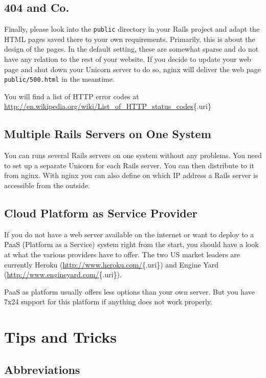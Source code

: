 \documentclass[a4paper]{book}
\newcommand{\chap}[1]{\newpage\thispagestyle{empty}\chapter{#1}\label{chap:\thechapter}}
\begin{document}
\section{404 and Co.}\label{and-co.}

Finally, please look into the \texttt{public} directory in your Rails project and adapt the HTML pages saved there to your own requirements. Primarily, this is about the design of the pages. In the default setting, these are somewhat sparse and do not have any relation to the rest of your website. If you decide to update your web page and shut down your Unicorn server to do so, nginx will deliver the web page \texttt{public/500.html} in the meantime.

You will find a list of HTTP error codes at \url{http://en.wikipedia.org/wiki/List_of_HTTP_status_codes}\{.uri\}

\section{Multiple Rails Servers on One System}\label{multiple-rails-servers-on-one-system}

You can runs several Rails servers on one system without any problems. You need to set up a separate Unicorn for each Rails server. You can then distribute to it from nginx. With nginx you can also define on which IP address a Rails server is accessible from the outside.

\section{Cloud Platform as Service Provider}\label{cloud-platform-as-service-provider}

If you do not have a web server available on the internet or want to deploy to a PaaS (Platform as a Service) system right from the start, you should have a look at what the various providers have to offer. The two US market leaders are currently Heroku (\url{http://www.heroku.com/}\{.uri\}) and Engine Yard (\url{http://www.engineyard.com/}\{.uri\}).

PaaS as platform usually offers less options than your own server. But you have 7x24 support for this platform if anything does not work properly.

\chap{Tips and Tricks}\label{tips-and-tricks}

\section{Abbreviations}\label{abbreviations}
\end{document}
